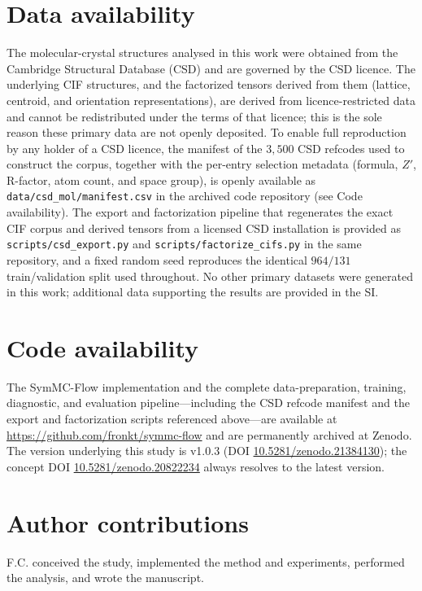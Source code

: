 \documentclass[11pt]{article}
\begin{document}
\section*{Data availability}
The molecular-crystal structures analysed in this work were obtained from the
Cambridge Structural Database (CSD)\cite{groom2016csd} and are governed by the
CSD licence. The underlying CIF structures, and the factorized tensors derived
from them (lattice, centroid, and orientation representations), are derived from
licence-restricted data and cannot be redistributed under the terms of that
licence; this is the sole reason these primary data are not openly deposited.
To enable full reproduction by any holder of a CSD licence, the manifest of the
$3{,}500$ CSD refcodes used to construct the corpus, together with the per-entry
selection metadata (formula, $Z'$, R-factor, atom count, and space group), is
openly available as \texttt{data/csd\_mol/manifest.csv} in the archived code
repository (see Code availability). The export and factorization pipeline that
regenerates the exact CIF corpus and derived tensors from a licensed CSD
installation is provided as \texttt{scripts/csd\_export.py} and
\texttt{scripts/factorize\_cifs.py} in the same repository, and a fixed random
seed reproduces the identical $964/131$ train/validation split used throughout.
No other primary datasets were generated in this work; additional data
supporting the results are provided in the SI.

\section*{Code availability}
The SymMC-Flow implementation and the complete data-preparation, training,
diagnostic, and evaluation pipeline---including the CSD refcode manifest and the
export and factorization scripts referenced above---are available at
\url{https://github.com/fronkt/symmc-flow} and are permanently archived at
Zenodo.\cite{cai2026symmcflow} The version underlying this study is v1.0.3
(DOI \href{https://doi.org/10.5281/zenodo.21384130}{10.5281/zenodo.21384130});
the concept DOI
\href{https://doi.org/10.5281/zenodo.20822234}{10.5281/zenodo.20822234}
always resolves to the latest version.

\section*{Author contributions}
F.C. conceived the study, implemented the method and experiments, performed the
analysis, and wrote the manuscript.
\end{document}

